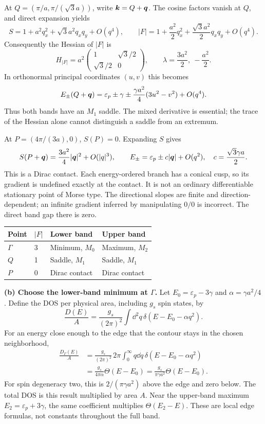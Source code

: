 At $Q=(\pi/a,\pi/(\sqrt3a))$, write $\boldsymbol{k}=Q+\boldsymbol{q}$. The cosine factors vanish at $Q$, and direct expansion yields
\[
S=1+a^2q_x^2+\sqrt3a^2q_xq_y+O(q^4),\qquad
|F|=1+\frac{a^2}{2}q_x^2+\frac{\sqrt3a^2}{2}q_xq_y+O(q^4).
\]
Consequently the Hessian of $|F|$ is
\[
H_{|F|}=a^2\begin{pmatrix}1&\sqrt3/2\\\sqrt3/2&0\end{pmatrix},
\qquad\lambda=\frac{3a^2}{2},\ -\frac{a^2}{2}.
\]
In orthonormal principal coordinates $(u,v)$ this becomes
\[
E_\pm(Q+\boldsymbol{q})=\varepsilon_p\pm\gamma
\pm\frac{\gamma a^2}{4}(3u^2-v^2)+O(q^4).
\]
Thus both bands have an $M_1$ saddle. The mixed derivative is essential; the trace of the Hessian alone cannot distinguish a saddle from an extremum.

At $P=(4\pi/(3a),0)$, $S(P)=0$. Expanding $S$ gives
\[
S(P+\boldsymbol{q})=\frac{3a^2}{4}|\boldsymbol{q}|^2+O(|q|^3),\qquad
E_\pm=\varepsilon_p\pm c|\boldsymbol{q}|+O(q^2),\quad c=\frac{\sqrt3\gamma a}{2}.
\]
This is a Dirac contact. Each energy-ordered branch has a conical cusp, so its gradient is undefined exactly at the contact. It is not an ordinary differentiable stationary point of Morse type. The directional slopes are finite and direction-dependent; an infinite gradient inferred by manipulating $0/0$ is incorrect. The direct band gap there is zero.

\begin{center}
\begin{tabular}{llll}
\toprule
Point & $|F|$ & Lower band & Upper band\\
\midrule
$\Gamma$ & 3 & Minimum, $M_0$ & Maximum, $M_2$\\
$Q$ & 1 & Saddle, $M_1$ & Saddle, $M_1$\\
$P$ & 0 & Dirac contact & Dirac contact\\
\bottomrule
\end{tabular}
\end{center}

\textbf{(b) Choose the lower-band minimum at $\Gamma$.}
Let $E_0=\varepsilon_p-3\gamma$ and $\alpha=\gamma a^2/4$. Define the DOS per physical area, including $g_s$ spin states, by
\[
\frac{D(E)}A=\frac{g_s}{(2\pi)^2}\int\dd^2q\,
\delta(E-E_0-\alpha q^2).
\]
For an energy close enough to the edge that the contour stays in the chosen neighborhood,
\begin{align*}
\frac{D_\Gamma(E)}A
&=\frac{g_s}{(2\pi)^2}\,2\pi\int_0^\infty q\dd q\,
\delta(E-E_0-\alpha q^2)\\
&=\frac{g_s}{4\pi\alpha}\Theta(E-E_0)
=\boxed{\frac{g_s}{\pi\gamma a^2}\Theta(E-E_0)}.
\end{align*}
For spin degeneracy two, this is $2/(\pi\gamma a^2)$ above the edge and zero below. The total DOS is this result multiplied by area $A$. Near the upper-band maximum $E_2=\varepsilon_p+3\gamma$, the same coefficient multiplies $\Theta(E_2-E)$. These are local edge formulas, not constants throughout the full band.

